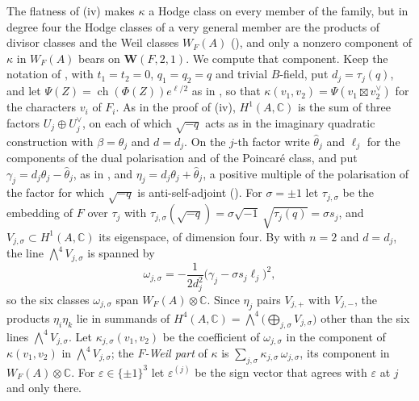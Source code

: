\documentclass[11pt,reqno]{amsart}
\theoremstyle{plain}
\theoremstyle{definition}
\theoremstyle{remark}
\newcommand{\CC}{\mathbb{C}}
\DeclareMathOperator{\ch}{ch}
\begin{document}
The flatness of (iv) makes $\kappa$ a Hodge class on
every member of the family, but in degree four the Hodge classes of a very
general member are the products of divisor classes and the Weil classes
$W_{F}(A)$ (\cite[Proposition~17.3(iii)]{paperI}), and only a nonzero component of
$\kappa$ in $W_{F}(A)$ bears on $\mathbf{W}(F,2,1)$. We compute that
component. Keep the notation of , with $t_{1}=t_{2}=0$,
$q_{1}=q_{2}=q$ and trivial $B$-field, put $d_{j}=\tau_{j}(q)$, and let
$\Psi(Z)=\ch(\Phi(Z))e^{\ell/2}$ as in , so that
$\kappa(v_{1},v_{2})=\Psi(v_{1}\boxtimes v_{2}^{\vee})$ for the characters
$v_{i}$ of $F_{i}$. As in the proof of (iv),
$H^{1}(A,\CC)$ is the sum of three factors $U_{j}\oplus U_{j}^{\vee}$, on each
of which $\sqrt{-q}$ acts as in the imaginary quadratic construction with
$\beta=\theta_{j}$ and $d=d_{j}$. On the $j$-th factor write
$\widehat\theta_{j}$ and $\ell_{j}$ for the components of the dual
polarisation and of the Poincar\'e class, and put
$\gamma_{j}=d_{j}\theta_{j}-\widehat\theta_{j}$, as in \cite[(33)]{paperI},
and $\eta_{j}=d_{j}\theta_{j}+\widehat\theta_{j}$, a positive multiple of the
polarisation of the factor for which $\sqrt{-q}$ is anti-self-adjoint
(\cite[Proposition~15.19(i)]{paperI}). For $\sigma=\pm1$ let $\tau_{j,\sigma}$ be the
embedding of $F$ over $\tau_{j}$ with
$\tau_{j,\sigma}(\sqrt{-q})=\sigma\sqrt{-1}\,\sqrt{\tau_{j}(q)}=\sigma s_{j}$,
and $V_{j,\sigma}\subset H^{1}(A,\CC)$ its eigenspace, of dimension four. By
\cite[Theorem~15.2(ii)]{paperI} with $n=2$ and $d=d_{j}$, the line
$\bigwedge^{4}V_{j,\sigma}$ is spanned by
\begin{equation}\label{eq:sexticomega}
  \omega_{j,\sigma}=-\frac{1}{2d_{j}^{2}}\bigl(\gamma_{j}-\sigma s_{j}\ell_{j}\bigr)^{2},
\end{equation}
so the six classes $\omega_{j,\sigma}$ span $W_{F}(A)\otimes\CC$. Since
$\eta_{j}$ pairs $V_{j,+}$ with $V_{j,-}$, the products $\eta_{i}\eta_{k}$ lie
in summands of $H^{4}(A,\CC)=\bigwedge^{4}\bigl(\bigoplus_{j,\sigma}
V_{j,\sigma}\bigr)$ other than the six lines $\bigwedge^{4}V_{j,\sigma}$. Let
$\kappa_{j,\sigma}(v_{1},v_{2})$ be the coefficient of $\omega_{j,\sigma}$ in
the component of $\kappa(v_{1},v_{2})$ in $\bigwedge^{4}V_{j,\sigma}$; the
\emph{$F$-Weil part} of $\kappa$ is
$\sum_{j,\sigma}\kappa_{j,\sigma}\,\omega_{j,\sigma}$, its component in
$W_{F}(A)\otimes\CC$. For $\varepsilon\in\{\pm1\}^{3}$ let
$\varepsilon^{(j)}$ be the sign vector that agrees with $\varepsilon$ at $j$
and only there.
\end{document}
